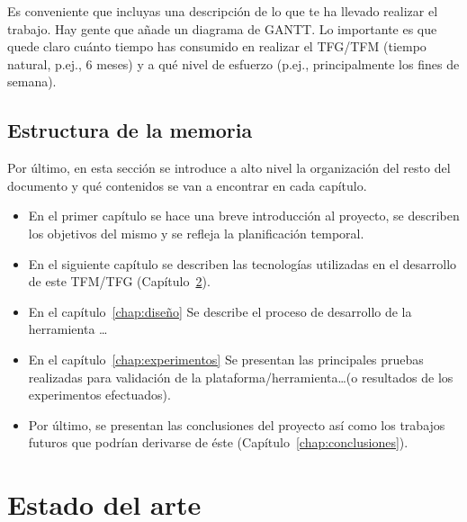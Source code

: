 \documentclass[a4paper, 12pt]{book}
\begin{document}
Es conveniente que incluyas una descripción de lo que te ha llevado realizar el trabajo.
Hay gente que añade un diagrama de GANTT.
Lo importante es que quede claro cuánto tiempo has consumido en realizar el TFG/TFM 
(tiempo natural, p.ej., 6 meses) y a qué nivel de esfuerzo (p.ej., principalmente los 
fines de semana).

\section{Estructura de la memoria}
\label{sec:estructura}

Por último, en esta sección se introduce a alto nivel la organización del resto del documento
y qué contenidos se van a encontrar en cada capítulo.

    \begin{itemize}
      \item En el primer capítulo se hace una breve introducción al proyecto, se describen los objetivos del mismo y se refleja la planificación temporal.
      \item En el siguiente capítulo se describen las tecnologías utilizadas en el desarrollo de este TFM/TFG (Capítulo~\ref{chap:tecnologias}).
      \item En el capítulo~\ref{chap:diseño} Se describe el proceso de desarrollo
      de la herramienta \ldots
      \item En el capítulo~\ref{chap:experimentos} Se presentan las principales pruebas realizadas
      para validación de la plataforma/herramienta\ldots (o resultados de los experimentos
      efectuados).
      \item Por último, se presentan las conclusiones del proyecto así como los trabajos futuros que podrían derivarse de éste (Capítulo~\ref{chap:conclusiones}).
    \end{itemize}

\cleardoublepage


\chapter{Estado del arte}               %
\label{chap:tecnologias}
\end{document}
